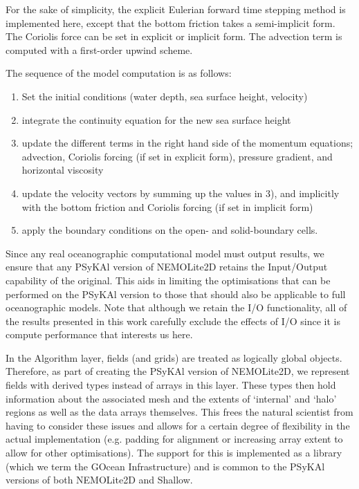 \documentclass[gmdd, manuscript]{copernicus}
\begin{document}
For the sake of simplicity, the explicit Eulerian forward time
stepping method is implemented here, except that the bottom friction
takes a semi-implicit form.  The Coriolis force can be set in explicit
or implicit form. The advection term is computed with a first-order
upwind scheme.

The sequence of the model computation is as follows:
\begin{enumerate}
\item Set the initial conditions (water depth, sea surface height, velocity)
\item integrate the continuity equation for the new sea surface height
\item update the different terms in the right hand side of the momentum equations; advection, Coriolis forcing (if set in explicit form), pressure gradient, and horizontal viscosity
\item update the velocity vectors by summing up the values in 3), and implicitly with the bottom friction and Coriolis forcing (if set in implicit form)
\item apply the boundary conditions on the open- and solid-boundary cells.
\end{enumerate}

Since any real oceanographic computational model must output results,
we ensure that any {PS}y{KA}l version of NEMOLite2D retains the Input/Output
capability of the original. This aids in limiting the optimisations
that can be performed on the {PS}y{KA}l version to those that should also
be applicable to full oceanographic models. Note that although we
retain the I/O functionality, all of the results presented in this work
carefully exclude the effects of I/O since it is compute performance
that interests us here.

In the Algorithm layer, fields (and grids) are treated as logically
global objects. Therefore, as part of creating the {PS}y{KA}l version
of NEMOLite2D, we represent fields with derived types instead of
arrays in this layer. These types then hold information about the
associated mesh and the extents of `internal' and `halo' regions as
well as the data arrays themselves. This frees the natural scientist
from having to consider these issues and allows for a certain degree
of flexibility in the actual implementation (e.g. padding for
alignment or increasing array extent to allow for other
optimisations). The support for this is implemented as a library
(which we term the GOcean Infrastructure) and is common to the
{PS}y{KA}l versions of both NEMOLite2D and Shallow.
\end{document}
